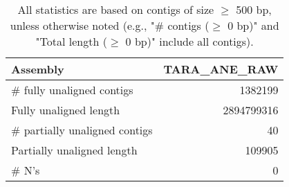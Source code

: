 \documentclass[12pt,a4paper]{article}
\begin{document}
\begin{table}[ht]
\begin{center}
\caption{All statistics are based on contigs of size $\geq$ 500 bp, unless otherwise noted (e.g., "\# contigs ($\geq$ 0 bp)" and "Total length ($\geq$ 0 bp)" include all contigs).}
\begin{tabular}{|l*{1}{|r}|}
\hline
Assembly & TARA\_ANE\_RAW \\ \hline
\# fully unaligned contigs & 1382199 \\ \hline
Fully unaligned length & 2894799316 \\ \hline
\# partially unaligned contigs & 40 \\ \hline
Partially unaligned length & 109905 \\ \hline
\# N's & 0 \\ \hline
\end{tabular}
\end{center}
\end{table}
\end{document}
